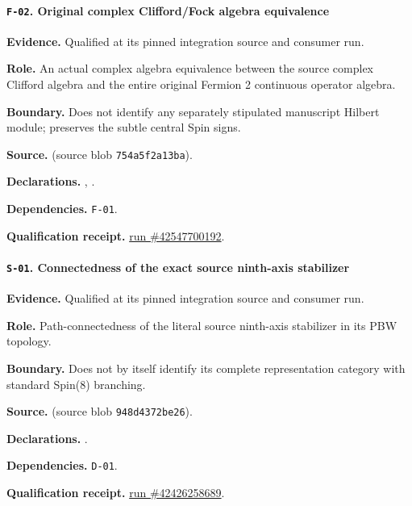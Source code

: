 \paragraph{\texttt{F-02}. Original complex Clifford/Fock algebra equivalence}
\noindent\textbf{Evidence.} Qualified at its pinned integration source and consumer run.
\par\noindent\textbf{Role.} An actual complex algebra equivalence between the source complex Clifford algebra and the entire original Fermion 2 continuous operator algebra.
\par\noindent\textbf{Boundary.} Does not identify any separately stipulated manuscript Hilbert module; preserves the subtle central Spin signs.
\par\noindent\textbf{Source.}  (source blob \texttt{754a5f2a13ba}).
\par\noindent\textbf{Declarations.} , .
\par\noindent\textbf{Dependencies.} \texttt{F-01}.
\par\noindent\textbf{Qualification receipt.} \href{https://github.com/etblink/math/actions/runs/42547700192}{run \#42547700192}.
\medskip

\paragraph{\texttt{S-01}. Connectedness of the exact source ninth-axis stabilizer}
\noindent\textbf{Evidence.} Qualified at its pinned integration source and consumer run.
\par\noindent\textbf{Role.} Path-connectedness of the literal source ninth-axis stabilizer in its PBW topology.
\par\noindent\textbf{Boundary.} Does not by itself identify its complete representation category with standard Spin(8) branching.
\par\noindent\textbf{Source.}  (source blob \texttt{948d4372be26}).
\par\noindent\textbf{Declarations.} .
\par\noindent\textbf{Dependencies.} \texttt{D-01}.
\par\noindent\textbf{Qualification receipt.} \href{https://github.com/etblink/math/actions/runs/42426258689}{run \#42426258689}.
\medskip

